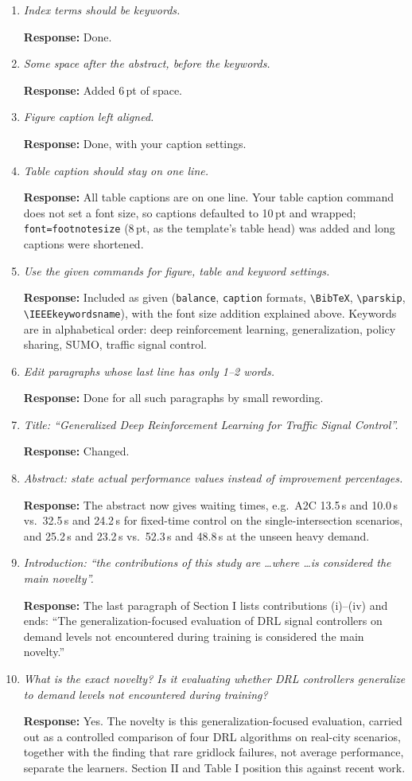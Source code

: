 \documentclass[11pt,a4paper]{article}
\newcommand{\cm}[2]{\item[\textbf{#1.}] \textit{#2}\par}
\newcommand{\re}{\par\textbf{Response:} }
\begin{document}
\begin{enumerate}[leftmargin=*, label={}, itemsep=6pt]
\cm{12}{Index terms should be keywords.}
\re Done.

\cm{13}{Some space after the abstract, before the keywords.}
\re Added 6\,pt of space.

\cm{14}{Figure caption left aligned.}
\re Done, with your caption settings.

\cm{15}{Table caption should stay on one line.}
\re All table captions are on one line. Your table caption command does not set a font size, so captions defaulted to 10\,pt and wrapped; \texttt{font=footnotesize} (8\,pt, as the template's table head) was added and long captions were shortened.

\cm{16}{Use the given commands for figure, table and keyword settings.}
\re Included as given (\texttt{balance}, \texttt{caption} formats, \verb|\BibTeX|, \verb|\parskip|, \verb|\IEEEkeywordsname|), with the font size addition explained above. Keywords are in alphabetical order: deep reinforcement learning, generalization, policy sharing, SUMO, traffic signal control.

\cm{17}{Edit paragraphs whose last line has only 1--2 words.}
\re Done for all such paragraphs by small rewording.

\cm{18}{Title: ``Generalized Deep Reinforcement Learning for Traffic Signal Control''.}
\re Changed.

\cm{19}{Abstract: state actual performance values instead of improvement percentages.}
\re The abstract now gives waiting times, e.g.\ A2C 13.5\,s and 10.0\,s vs.\ 32.5\,s and 24.2\,s for fixed-time control on the single-intersection scenarios, and 25.2\,s and 23.2\,s vs.\ 52.3\,s and 48.8\,s at the unseen heavy demand.

\cm{20}{Introduction: ``the contributions of this study are \ldots where \ldots is considered the main novelty''.}
\re The last paragraph of Section I lists contributions (i)--(iv) and ends: ``The generalization-focused evaluation of DRL signal controllers on demand levels not encountered during training is considered the main novelty.''

\cm{21}{What is the exact novelty? Is it evaluating whether DRL controllers generalize to demand levels not encountered during training?}
\re Yes. The novelty is this generalization-focused evaluation, carried out as a controlled comparison of four DRL algorithms on real-city scenarios, together with the finding that rare gridlock failures, not average performance, separate the learners. Section II and Table I position this against recent work.


\end{enumerate}
\end{document}
